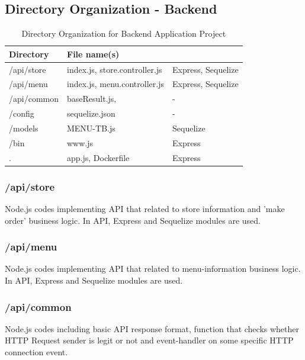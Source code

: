 \documentclass[conference,compsoc]{IEEEtran}
\begin{document}
\subsection{Directory Organization - Backend}
\begin{table}[ht!] \renewcommand\arraystretch{1.25}
  \begin{threeparttable}
    \caption{Directory Organization for Backend Application Project%
    \label{tab:table6}}    %
    \begin{tabular}{@{}l l>{\raggedright\arraybackslash}p{3.2cm}@{}}
    \toprule
    \bfseries Directory & \bfseries File name(s) & \multicolumn{1}{l}{\bfseries Modules used} \\
    \midrule
      /api/store &	index.js, store.controller.js	& Express, Sequelize \\
      /api/menu &	index.js, menu.controller.js	& Express, Sequelize \\
      /api/common & baseResult.js, & - \\
      /config & sequelize.json & - \\
      /models & MENU-TB.js & Sequelize \\
      /bin	& www.js	& Express \\
      .	& app.js, Dockerfile	& Express \\
      \bottomrule
      \end{tabular}
  \end{threeparttable}
\end{table}

\subsubsection{/api/store}
Node.js codes implementing API that related to store information and 'make order' business logic. In API, Express and Sequelize modules are used.

\subsubsection{/api/menu} 
Node.js codes implementing API that related to menu-information business logic. In API, Express and Sequelize modules are used.

\subsubsection{/api/common} 
Node.js codes including basic API response format, function that checks whether HTTP Request sender is legit or not and event-handler on some specific HTTP connection event. 
\end{document}
